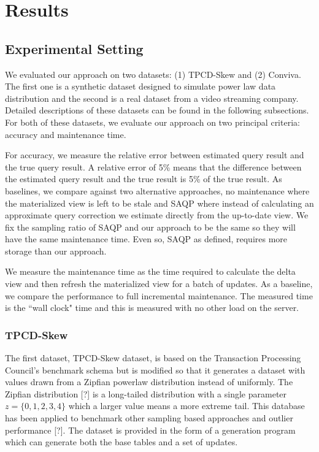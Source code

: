 \section{Results}

\subsection{Experimental Setting}
We evaluated our approach on two datasets: (1) TPCD-Skew and (2) Conviva.
The first one is a synthetic dataset designed to simulate power law data distribution and the second is 
a real dataset from a video streaming company.
Detailed descriptions of these datasets can be found in the following subsections.
For both of these datasets, we evaluate our approach on two principal criteria: accuracy and maintenance time.

For accuracy, we measure the relative error between estimated query result and the true query result.
A relative error of 5\% means that the difference between the estimated query result and the true result is 5\% of the true result.
As baselines, we compare against two alternative approaches, no maintenance where the materialized view is left to be stale and SAQP where instead 
of calculating an approximate query correction we estimate directly from the up-to-date view.
We fix the sampling ratio of SAQP and our approach to be the same so they will have the same maintenance time.
Even so, SAQP as defined, requires more storage than our approach.

We measure the maintenance time as the time required to calculate the delta view and then refresh the materialized view for a batch of updates.
As a baseline, we compare the performance to full incremental maintenance.
The measured time is the ``wall clock" time and this is measured with no other load on the server.

\subsubsection{TPCD-Skew}
The first dataset, TPCD-Skew dataset, is based on the Transaction Processing Council's benchmark
schema but is modified so that it generates a dataset with values drawn from a Zipfian powerlaw distribution instead of uniformly.
The Zipfian distribution [?] is a long-tailed distribution with a single parameter $z=\{0,1,2,3,4\}$ which a larger
value means a more extreme tail.
This database has been applied to benchmark other sampling based approaches and outlier performance [?].
The dataset is provided in the form of a generation program which can generate both the base tables and a set of updates.

